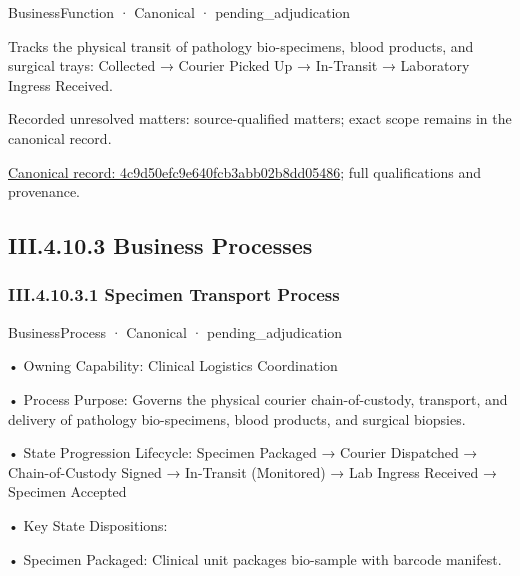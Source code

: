 \label{element:4c9d50efc9e640fcb3abb02b8dd05486}
{\small BusinessFunction · Canonical · pending\_adjudication}\par

Tracks the physical transit of pathology bio-specimens, blood products, and surgical trays: Collected → Courier Picked Up → In-Transit → Laboratory Ingress Received.


{\small Recorded unresolved matters: source-qualified matters; exact scope remains in the canonical record.}\par
{\footnotesize \href{../../../../continuum/business/business-function/4c9d50efc9e640fcb3abb02b8dd05486.md}{Canonical record: 4c9d50efc9e640fcb3abb02b8dd05486}; full qualifications and provenance.}\par
\subsection*{III.4.10.3 Business Processes}
\label{navigation:III.4.10.3}

\subsubsection*{III.4.10.3.1 Specimen Transport Process}
\label{navigation:III.4.10.3.1}

\label{element:11bb000294fc44a8af295f4682e2fe6c}
{\small BusinessProcess · Canonical · pending\_adjudication}\par

•
Owning Capability: Clinical Logistics Coordination



•
Process Purpose: Governs the physical courier chain-of-custody, transport, and delivery of pathology bio-specimens, blood products, and surgical biopsies.



•
State Progression Lifecycle: Specimen Packaged → Courier Dispatched → Chain-of-Custody Signed → In-Transit (Monitored) → Lab Ingress Received → Specimen Accepted



•
Key State Dispositions:



•
Specimen Packaged: Clinical unit packages bio-sample with barcode manifest.



